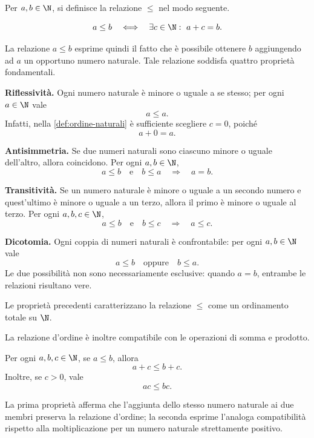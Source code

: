 Per \(a,b\in\N\), si definisce la relazione \(\le\) nel modo seguente.

\begin{definition}
\label{def:ordine-naturali}
\[
  a\le b
  \quad\Longleftrightarrow\quad
  \exists c\in\N:\ a+c=b.
\]
\end{definition}

La relazione \(a\le b\) esprime quindi il fatto che è possibile ottenere
\(b\) aggiungendo ad \(a\) un opportuno numero naturale. Tale relazione
soddisfa quattro proprietà fondamentali.

\textbf{Riflessività.}
Ogni numero naturale è minore o uguale a se stesso; per ogni \(a\in\N\)
vale
\[
  a\le a.
\]
Infatti, nella \cref{def:ordine-naturali} è sufficiente scegliere \(c=0\),
poiché
\[
  a+0=a.
\]

\textbf{Antisimmetria.}
Se due numeri naturali sono ciascuno minore o uguale dell'altro, allora
coincidono. Per ogni \(a,b\in\N\),
\[
  a\le b
  \quad\text{e}\quad
  b\le a
  \quad\Longrightarrow\quad
  a=b.
\]

\textbf{Transitività.}
Se un numero naturale è minore o uguale a un secondo numero e quest'ultimo
è minore o uguale a un terzo, allora il primo è minore o uguale al terzo.
Per ogni \(a,b,c\in\N\),
\[
  a\le b
  \quad\text{e}\quad
  b\le c
  \quad\Longrightarrow\quad
  a\le c.
\]

\textbf{Dicotomia.}
Ogni coppia di numeri naturali è confrontabile: per ogni \(a,b\in\N\)
vale
\[
  a\le b
  \quad\text{oppure}\quad
  b\le a.
\]
Le due possibilità non sono necessariamente esclusive: quando \(a=b\),
entrambe le relazioni risultano vere.

Le proprietà precedenti caratterizzano la relazione \(\le\) come un
ordinamento totale su \(\N\).

La relazione d'ordine è inoltre compatibile con le operazioni di somma e
prodotto.

\begin{proposition}
\label{prop:compatibilita-ordine}
Per ogni \(a,b,c\in\N\), se \(a\le b\), allora
\[
  a+c\le b+c.
\]
Inoltre, se \(c>0\), vale
\[
  ac\le bc.
\]
\end{proposition}

La prima proprietà afferma che l'aggiunta dello stesso numero naturale ai
due membri preserva la relazione d'ordine; la seconda esprime l'analoga
compatibilità rispetto alla moltiplicazione per un numero naturale
strettamente positivo.

